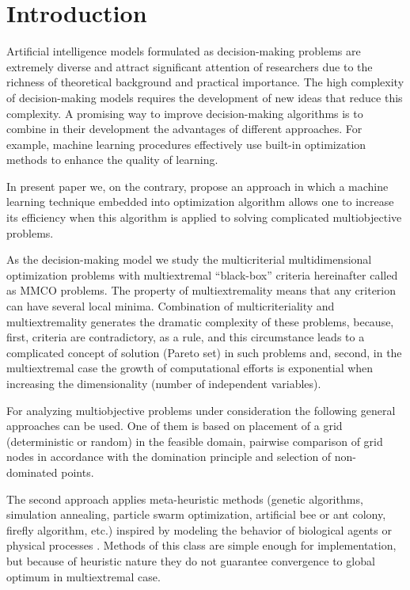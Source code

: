 \documentclass[runningheads]{llncs}
\begin{document}
\section{Introduction}
Artificial intelligence models formulated as decision-making problems are extremely diverse and attract significant attention of researchers due to the richness of theoretical background and practical importance. The high complexity of decision-making models requires the development of new ideas that reduce this complexity. A promising way to improve decision-making algorithms is to combine in their development the advantages of different approaches. For example, machine learning procedures effectively use built-in optimization methods to enhance the quality of learning. 

In present paper we, on the contrary, propose an approach in which a machine learning technique embedded into optimization algorithm allows one to increase its efficiency when this algorithm is applied to solving complicated multiobjective problems. 

As the decision-making model we study the multicriterial multidimensional optimization problems with multiextremal ``black-box'' criteria hereinafter called as MMCO problems. The property of multiextremality means that any criterion can have several local minima. Combination of multicriteriality and multiextremality generates the dramatic complexity of these problems, because, first, criteria are contradictory, as a rule, and this circumstance leads to a complicated concept of solution (Pareto set) in such problems and, second, in the multiextremal case the growth of computational efforts is exponential when increasing the dimensionality (number of independent variables).

For analyzing multiobjective problems under consideration the following general approaches can be used. One of them is based on placement of a grid (deterministic or random) in the feasible domain, pairwise comparison of grid nodes in accordance with the domination principle and selection of non-dominated points. 

The second approach applies meta-heuristic methods (genetic algorithms, simulation annealing, particle swarm optimization, artificial bee or ant colony, firefly algorithm, etc.) inspired by modeling the behavior of biological agents \cite{Nebro2009,RC05,Mostaghim2007,Durillo2010} or physical processes \cite{DPA02,ZLT01}. Methods of this class are simple enough for implementation, but because of heuristic nature they do not guarantee convergence to global optimum in multiextremal case. 
\end{document}
